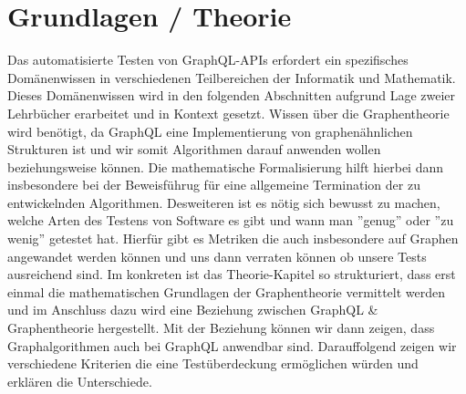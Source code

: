 \chapter{Grundlagen / Theorie}

Das automatisierte Testen von GraphQL-APIs erfordert ein spezifisches Domänenwissen in verschiedenen Teilbereichen der
Informatik und Mathematik.
Dieses Domänenwissen wird in den folgenden Abschnitten aufgrund Lage zweier Lehrbücher erarbeitet
und in Kontext gesetzt.
Wissen über die Graphentheorie wird benötigt, da GraphQL eine Implementierung von graphenähnlichen Strukturen
ist und wir somit Algorithmen darauf anwenden wollen beziehungsweise können.
Die mathematische Formalisierung hilft hierbei dann insbesondere
bei der Beweisführug für eine allgemeine Termination der zu entwickelnden Algorithmen.
Desweiteren ist es nötig sich bewusst zu machen, welche Arten des Testens von Software es gibt und wann man ''genug'' oder ''zu wenig'' getestet hat.
Hierfür gibt es Metriken die auch insbesondere auf Graphen angewandet werden können und uns dann verraten können ob unsere Tests ausreichend sind.
Im konkreten ist das Theorie-Kapitel so strukturiert, dass erst einmal die mathematischen Grundlagen der Graphentheorie
vermittelt werden und im Anschluss dazu wird eine Beziehung zwischen GraphQL \& Graphentheorie hergestellt.
Mit der Beziehung können wir dann zeigen, dass Graphalgorithmen auch bei GraphQL anwendbar sind.
Darauffolgend zeigen wir verschiedene Kriterien die eine Testüberdeckung ermöglichen würden und erklären die Unterschiede.
